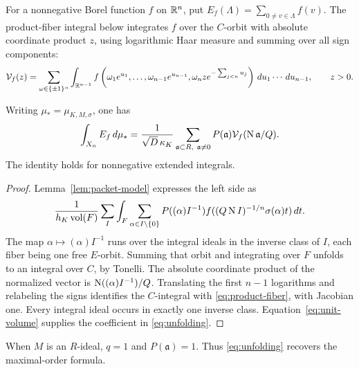 For a nonnegative Borel function $f$ on $\mathbb R^n$, put
$E_f(\Lambda)=\sum_{0\ne v\in\Lambda}f(v)$.
The product-fiber integral below integrates $f$ over the $C$-orbit
with absolute coordinate product $z$, using logarithmic Haar measure
and summing over all sign components:
\begin{equation}\label{eq:product-fiber}
 \mathcal V_f(z)=\sum_{\omega\in\{\pm1\}^n}
 \int_{\mathbb R^{n-1}}
 f\left(\omega_1e^{u_1},\ldots,\omega_{n-1}e^{u_{n-1}},
      \omega_n z e^{-\sum_{j<n}u_j}\right)
 \,d u_1\cdots\,d u_{n-1},\qquad z>0.
\end{equation}

\begin{proposition}\label{prop:unfolding}
Writing $\mu_*=\mu_{K,M,\sigma}$, one has
\begin{equation}\label{eq:unfolding}
 \int_{X_n}E_f\,d\mu_*
 =\frac1{\sqrt D\,\kappa_K}
       \sum_{\mathfrak a\subset R,\ \mathfrak a\ne0}
           P(\mathfrak a)\mathcal V_f(\operatorname{N}\mathfrak a/Q).
\end{equation}
The identity holds for nonnegative extended integrals.
\end{proposition}

\begin{proof}
Lemma~\ref{lem:packet-model} expresses the left side as
\[
 \frac1{h_K\operatorname{vol}(F)}
 \sum_I\int_F\sum_{\alpha\in I\setminus\{0\}}
   P((\alpha)I^{-1})
   f((Q\operatorname{N} I)^{-1/n}\sigma(\alpha)t)\,d t.
\]
The map $\alpha\mapsto(\alpha)I^{-1}$ runs over the integral
ideals in the inverse class of $I$, each fiber being one free
$E$-orbit. Summing that orbit and integrating over $F$ unfolds
to an integral over $C$, by Tonelli. The absolute coordinate
product of the normalized vector is
$\operatorname{N}((\alpha)I^{-1})/Q$. Translating the first $n-1$ logarithms
and relabeling the signs identifies the $C$-integral with
\eqref{eq:product-fiber}, with Jacobian one.
Every integral ideal occurs in exactly one inverse class.
Equation~\eqref{eq:unit-volume} supplies the coefficient in
\eqref{eq:unfolding}.
\end{proof}

When $M$ is an $R$-ideal, $q=1$ and $P(\mathfrak a)=1$.
Thus \eqref{eq:unfolding} recovers the maximal-order formula.
